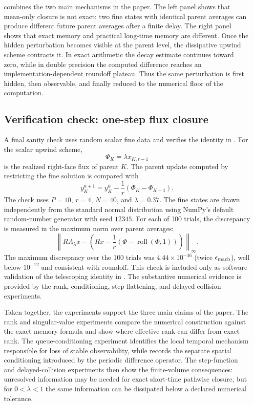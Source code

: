\documentclass[preprint,12pt]{elsarticle}
\theoremstyle{plain}
\theoremstyle{remark}
\theoremstyle{definition}
\newcommand{\epsmach}{\epsilon_{\rm mach}}
\begin{document}
 combines the two main mechanisms in the paper. The left panel shows that mean-only closure is not exact: two fine states with identical parent averages can produce different future parent averages after a finite delay.  The right panel shows that exact memory and practical long-time memory are different.  Once the hidden perturbation becomes visible at the parent level, the dissipative upwind scheme contracts it.  In exact
arithmetic the decay estimate continues toward zero, while in double precision the computed difference reaches an implementation-dependent
roundoff plateau.  Thus the same perturbation is first hidden, then observable, and finally reduced to the numerical floor of the computation.

\subsection{Verification check: one-step flux closure}

A final sanity check uses random scalar fine data and verifies the identity
in .  For the scalar upwind scheme,
\[
  \Phi_{K}=\lambda x_{K,r-1}
\]
is the realized right-face flux of parent \(K\).  The parent update computed
by restricting the fine solution is compared with
\[
  y_K^{n+1}=y_K^n-\frac1r(\Phi_K-\Phi_{K-1}).
\]
The check uses \(P=10\), \(r=4\), \(N=40\), and \(\lambda=0.37\).  The fine
states are drawn independently from the standard normal distribution using
NumPy's default random-number generator with seed \(12345\).  For each of
100 trials, the discrepancy is measured in the maximum norm over parent averages:
\[
  \left\|
  R A_\lambda x
  -
  \left(
  Rx-\frac1r(\Phi-\operatorname{roll}(\Phi,1))
  \right)
  \right\|_\infty .
\]
The maximum discrepancy over the 100 trials was \(4.44\times10^{-16}\) (twice \(\epsmach\)), well below \(10^{-12}\) and consistent with roundoff. This check is included only as software validation of the telescoping
identity in .  The substantive numerical evidence is provided by the rank, conditioning, step-flattening, and delayed-collision
experiments.

Taken together, the experiments support the three main claims of the paper. The rank and singular-value experiments compare the numerical construction against the exact memory formula and show where effective rank can differ from exact rank.  The queue-conditioning experiment identifies the local temporal mechanism responsible for loss of stable observability, while  records the separate spatial conditioning introduced by the periodic difference operator.  The step-function and delayed-collision experiments then show the finite-volume consequences: unresolved information may be needed for exact short-time pathwise closure, but for \(0<\lambda<1\) the same information can be dissipated below a declared numerical tolerance.
\end{document}
